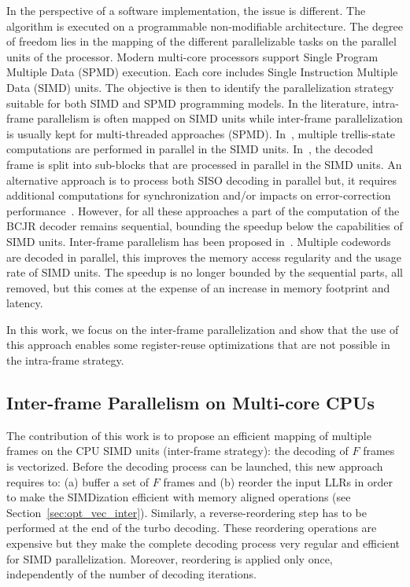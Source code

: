 In the perspective of a software implementation, the issue is different. The
algorithm is executed on a programmable non-modifiable architecture. The degree
of freedom lies in the mapping of the different parallelizable tasks on the
parallel units of the processor. Modern multi-core processors support Single
Program Multiple Data (SPMD) execution. Each core includes Single Instruction
Multiple Data (SIMD) units. The objective is then to identify the
parallelization strategy suitable for both SIMD and SPMD programming models.
In the literature, intra-frame parallelism is often mapped on SIMD units while
inter-frame parallelization is usually kept for multi-threaded approaches
(SPMD). In~\cite{Zhang2012,Wu2013}, multiple trellis-state computations are
performed in parallel in the SIMD units. In~\cite{Wu2010,Wu2011,Chinnici2012,
Yoge2012,Zhang2012,Liu2013,Chen2013,Xianjun2013,Wu2013,Zhang2014,Li2014}, the
decoded frame is split into sub-blocks that are processed in parallel in the
SIMD units. An alternative approach is to process both SISO decoding in
parallel but, it requires additional computations for synchronization and/or
impacts on error-correction performance~\cite{Muller2009}. However, for all
these approaches a part of the computation of the BCJR decoder remains
sequential, bounding the speedup below the capabilities of SIMD units.
Inter-frame parallelism has been proposed in~\cite{Wu2010,Wu2011,Zhang2012,
Wu2013}. Multiple codewords are decoded in parallel, this improves the memory
access regularity and the usage rate of SIMD units. The speedup is no longer
bounded by the sequential parts, all removed, but this comes at the expense of
an increase in memory footprint and latency.

In this work, we focus on the inter-frame parallelization and show that the use
of this approach enables some register-reuse optimizations that are not possible
in the intra-frame strategy.

\subsection{Inter-frame Parallelism on Multi-core CPUs}

The contribution of this work is to propose an efficient mapping of multiple
frames on the CPU SIMD units (inter-frame strategy): the decoding of $F$ frames
is vectorized. Before the decoding process can be launched, this new approach
requires to: (a) buffer a set of $F$ frames and (b) reorder the input LLRs in
order to make the SIMDization efficient with memory aligned operations (see
Section~\ref{sec:opt_vec_inter}). Similarly, a reverse-reordering step has to be
performed at the end of the turbo decoding. These reordering operations are
expensive but they make the complete decoding process very regular and efficient
for SIMD parallelization. Moreover, reordering is applied only once,
independently of the number of decoding iterations.

